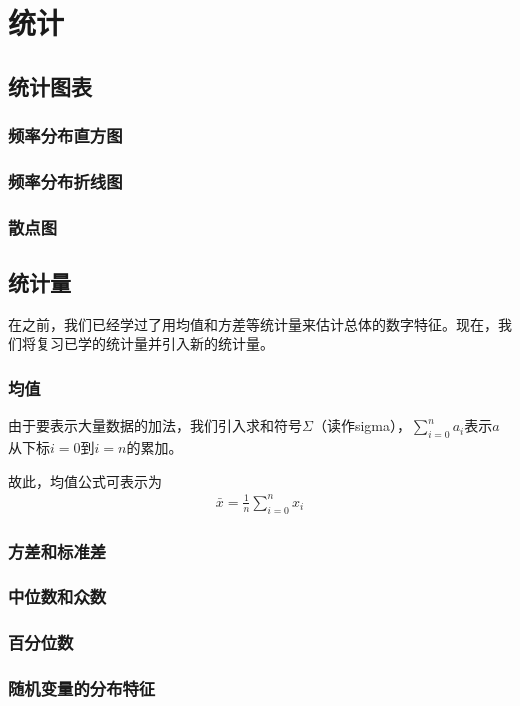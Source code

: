 \chapter{统计}

\section{统计图表}
\subsection{频率分布直方图}
\subsection{频率分布折线图}
\subsection{散点图}

\section{统计量}
在之前，我们已经学过了用均值和方差等统计量来估计总体的数字特征。现在，我们将复习已学的统计量并引入新的统计量。

\subsection{均值}
由于要表示大量数据的加法，我们引入求和符号$\Sigma$（读作sigma），${\displaystyle\sum_{i=0}^n a_i}$表示$a$从下标$i=0$到$i=n$的累加。

故此，均值公式可表示为
\begin{gather}
	\bar{x}=\frac{1}{n}\sum_{i=0}^n x_i \label{equ:mean-1}
\end{gather}

\subsection{方差和标准差}
\subsection{中位数和众数}
\subsection{百分位数}
\subsection{随机变量的分布特征}
